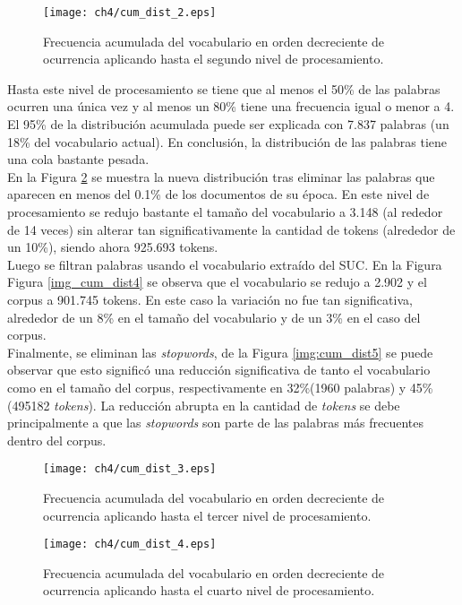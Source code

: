 \documentclass[letterpaper,12pt,oneside]{book} %
\begin{document}
\begin{figure}
    \centering
    \texttt{[image: ch4/cum\_dist\_2.eps]}
    \caption{Frecuencia acumulada del vocabulario en orden decreciente de ocurrencia aplicando hasta el segundo nivel de procesamiento.}
    \label{img:cum_dist2}
\end{figure}

Hasta este nivel de procesamiento se tiene que al menos el 50\% de las palabras ocurren una única vez y al menos un 80\% tiene una frecuencia igual o menor a 4. El 95\% de la distribución acumulada puede ser explicada con 7.837 palabras (un 18\% del vocabulario actual). En conclusión, la distribución de las palabras tiene una cola bastante pesada.\\

En la Figura \ref{img:cum_dist3} se muestra la nueva distribución tras eliminar las palabras que aparecen en menos del 0.1\% de los documentos de su época. En este nivel de procesamiento se redujo bastante el tamaño del vocabulario a 3.148 (al rededor de 14 veces) sin alterar tan significativamente la cantidad de tokens (alrededor de un 10\%), siendo ahora 925.693 tokens.\\

Luego se filtran palabras usando el vocabulario extraído del SUC. En la Figura Figura \ref{img_cum_dist4} se observa que el vocabulario se redujo a 2.902 y el corpus a 901.745 tokens. En este caso la variación no fue tan significativa, alrededor de un 8\% en el tamaño del vocabulario y de un 3\% en el caso del corpus.\\

Finalmente, se eliminan las \textit{stopwords}, de la Figura \ref{img:cum_dist5} se puede observar que esto significó una reducción significativa de tanto el vocabulario como en el tamaño del corpus, respectivamente en 32\%(1960 palabras) y 45\%(495182 \textit{tokens}). La reducción abrupta en la cantidad de \textit{tokens} se debe principalmente a que las \textit{stopwords} son parte de las palabras más frecuentes dentro del corpus.

\begin{figure}
    \centering
    \texttt{[image: ch4/cum\_dist\_3.eps]}
    \caption{Frecuencia acumulada del vocabulario en orden decreciente de ocurrencia aplicando hasta el tercer nivel de procesamiento.}
    \label{img:cum_dist3}
\end{figure}

\begin{figure}
    \centering
    \texttt{[image: ch4/cum\_dist\_4.eps]}
    \caption{Frecuencia acumulada del vocabulario en orden decreciente de ocurrencia aplicando hasta el cuarto nivel de procesamiento.}
    \label{img:cum_dist4}
\end{figure}
\end{document}
